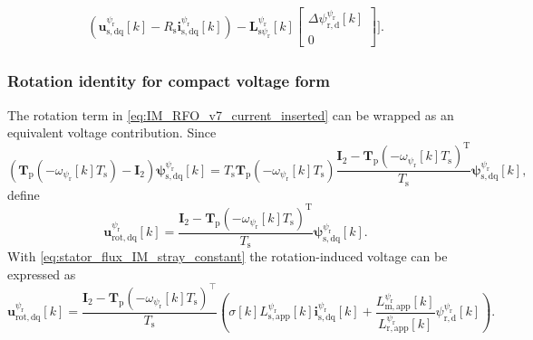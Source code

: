 \begin{frame}
\begin{equation}
\begin{split}
                                                                                           \left(\bm{u}^{\psi_\mathrm{r}}_{\mathrm{s},\mathrm{dq}}[k]-R_\mathrm{s}\bm{i}^{\psi_\mathrm{r}}_{\mathrm{s},\mathrm{dq}}[k]\right)
                                                                                           -\bm{L}^{\psi_\mathrm{r}}_{\mathrm{s}\psi_\mathrm{r}}[k]
                                                                                           \begin{bmatrix}\Delta\psi^{\psi_\mathrm{r}}_{\mathrm{r},\mathrm{d}}[k]\\0\end{bmatrix}\Bigg].
        \end{split}
        \label{eq:IM_RFO_v7_current_inserted}
    \end{equation}
\end{frame}

\begin{frame}
    \frametitle{Rotation identity for compact voltage form}
    The rotation term in \eqref{eq:IM_RFO_v7_current_inserted} can be wrapped as an equivalent voltage contribution. Since
    \begin{equation}
        \left(\bm{T}_\mathrm{p}(-\omega_{\psi_\mathrm{r}}[k]T_\mathrm{s})-\bm{I}_2\right)\bm{\psi}^{\psi_\mathrm{r}}_{\mathrm{s},\mathrm{dq}}[k]
        =T_\mathrm{s}\bm{T}_\mathrm{p}(-\omega_{\psi_\mathrm{r}}[k]T_\mathrm{s})
        \frac{\bm{I}_2-\bm{T}_\mathrm{p}(-\omega_{\psi_\mathrm{r}}[k]T_\mathrm{s})^{\mathrm{T}}}{T_\mathrm{s}}
        \bm{\psi}^{\psi_\mathrm{r}}_{\mathrm{s},\mathrm{dq}}[k],
        \label{eq:IM_RFO_v7_rotation_identity}
    \end{equation}
    define
    \begin{equation}
        \bm{u}^{\psi_\mathrm{r}}_{\mathrm{rot},\mathrm{dq}}[k]
        =\frac{\bm{I}_2-\bm{T}_\mathrm{p}(-\omega_{\psi_\mathrm{r}}[k]T_\mathrm{s})^{\mathrm{T}}}{T_\mathrm{s}}
        \bm{\psi}^{\psi_\mathrm{r}}_{\mathrm{s},\mathrm{dq}}[k].
        \label{eq:IM_RFO_v7_urot_def}
    \end{equation}\pause%
    With \eqref{eq:stator_flux_IM_stray_constant} the rotation-induced voltage can be expressed as
    \begin{equation}
        \bm{u}^{\psi_\mathrm{r}}_{\mathrm{rot},\mathrm{dq}}[k]
        =\frac{\bm{I}_2-\bm{T}_\mathrm{p}(-\omega_{\psi_\mathrm{r}}[k]T_\mathrm{s})^\top}{T_\mathrm{s}}
        \left(\sigma[k] L^{\psi_\mathrm{r}}_{\mathrm{s},\mathrm{app}}[k]\bm{i}^{\psi_\mathrm{r}}_{\mathrm{s},\mathrm{dq}}[k] + \frac{L^{\psi_\mathrm{r}}_{\mathrm{m},\mathrm{app}}[k]}{L^{\psi_\mathrm{r}}_{\mathrm{r},\mathrm{app}}[k]}\psi^{\psi_\mathrm{r}}_{\mathrm{r},\mathrm{d}}[k]\right).
    \end{equation}
\end{frame}

